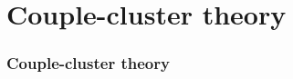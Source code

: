 \documentclass[UKenglish,aspectratio=169,12pt]{beamer}
\begin{document}
\section{Couple-cluster theory}

\begin{frame}
    \frametitle{Couple-cluster theory}

\end{frame}
\end{document}

